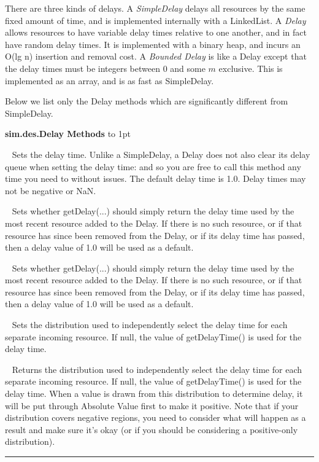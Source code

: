 \documentclass[twoside,10pt]{article}
\newcommand\class[1]{\index{Classes!{#1}}\textsf{#1}}
\newcommand*{\xfill}[1][0pt]{%
	\cleaders
		\hbox to 1pt{\hss
			\raisebox{#1}{\rule{1.2pt}{0.4pt}}%
			\hss}\hfill}
\newenvironment{methods}[1]{
\vspace{1.0em}\noindent\textsf{\textbf{#1 Methods}}\quad \xfill[0.5ex]
\vspace{-0.25em}
\begin{description}
\small}
{\end{description}\hrule\vspace{1.5em}}
\newcommand{\mthd}[1]{\item[{\sf #1}]~\newline}
\begin{document}
There are three kinds of delays.  A {\it SimpleDelay} delays all resources by the same fixed amount of time, and is implemented internally with a LinkedList.  A {\it Delay} allows resources to have variable delay times relative to one another, and in fact have random delay times.  It is implemented with a binary heap, and incurs an O(lg n) insertion and removal cost.  A {\it Bounded Delay} is like a Delay except that the delay times must be integers between 0 and some \(m\) exclusive.  This is implemented as an array, and is as fast as SimpleDelay.

Below we list only the Delay methods which are significantly different from SimpleDelay.

\begin{methods}{\class{sim.des.Delay}}
\mthd{public void setDelayTime(double delayTime)}
Sets the delay time.  Unlike a SimpleDelay, a Delay does not also clear its delay queue
    	when setting the delay time: and so you are free to call this method any time you need 
    	to without issues.  The default delay time is 1.0. Delay times may not be negative or NaN.  
    	
\mthd{public void setUsesLastDelay(boolean val)}
Sets whether getDelay(...) should simply return the delay time used by the most recent resource
    	added to the Delay.  If there is no such resource, or if that resource has since been 
    	removed from the Delay, or if its delay time has passed, then a delay value of 1.0 will
    	be used as a default.
	
\mthd{public boolean getUsesLastDelay()}
Sets whether getDelay(...) should simply return the delay time used by the most recent resource
    	added to the Delay. If there is no such resource, or if that resource has since been 
    	removed from the Delay, or if its delay time has passed, then a delay value of 1.0 will
    	be used as a default.
	
\mthd{public void setDelayDistribution(AbstractDistribution distribution)}
Sets the distribution used to independently select the delay time for each separate incoming 
        resource.  If null, the value of getDelayTime() is used for the delay time.
        
\mthd{public AbstractDistribution getDelayDistribution()}
 Returns the distribution used to independently select the delay time for each separate incoming 
        resource.  If null, the value of getDelayTime() is used for the delay time.  
        When a value is drawn from this distribution to determine
        delay, it will be put through Absolute Value first to make it positive.  Note that if your 
        distribution covers negative regions, you need to consider what will happen as a result and 
        make sure it's okay (or if you should be considering a positive-only distribution).
        

\end{methods}
\end{document}
